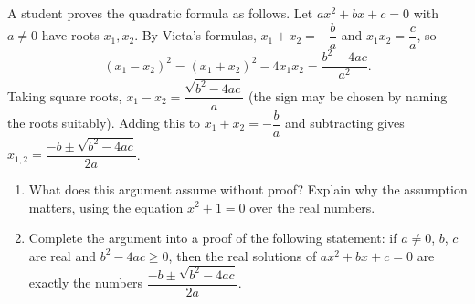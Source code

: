A student proves the quadratic formula as follows. Let $ax^2+bx+c=0$ with $a\ne0$ have roots $x_1,x_2$. By Vieta's formulas, $x_1+x_2=-\dfrac ba$ and $x_1x_2=\dfrac ca$, so
\[(x_1-x_2)^2=(x_1+x_2)^2-4x_1x_2=\dfrac{b^2-4ac}{a^2}.\]
Taking square roots, $x_1-x_2=\dfrac{\sqrt{b^2-4ac}}{a}$ (the sign may be chosen by naming the roots suitably). Adding this to $x_1+x_2=-\dfrac ba$ and subtracting gives $x_{1,2}=\dfrac{-b\pm\sqrt{b^2-4ac}}{2a}$.

\begin{enumerate}
\item[(a)] What does this argument assume without proof? Explain why the assumption matters, using the equation $x^2+1=0$ over the real numbers.
\item[(b)] Complete the argument into a proof of the following statement: if $a\ne0$, $b$, $c$ are real and $b^2-4ac\ge0$, then the real solutions of $ax^2+bx+c=0$ are exactly the numbers $\dfrac{-b\pm\sqrt{b^2-4ac}}{2a}$.
\end{enumerate}
